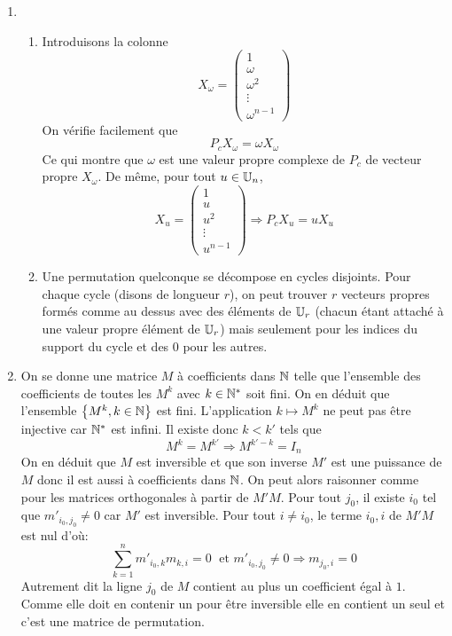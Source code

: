 \begin{enumerate}
  \item 
\begin{enumerate}
  \item   Introduisons la colonne
\begin{displaymath}
  X_{\omega}=
\begin{pmatrix}
  1 \\ \omega \\ \omega^2 \\ \vdots \\ \omega^{n-1}
\end{pmatrix}
\end{displaymath}
On vérifie facilement que
\begin{displaymath}
P_{c}X_\omega = \omega X_\omega  
\end{displaymath}
Ce qui montre que $\omega$ est une valeur propre complexe de $P_c$ de vecteur propre $X_\omega$. De même, pour tout $u\in \mathbb{U}_n$,
\begin{displaymath}
  X_{u}=
\begin{pmatrix}
  1 \\ u \\ u^2 \\ \vdots \\ u^{n-1}
\end{pmatrix}
\Rightarrow P_{c}X_u = u X_u  
\end{displaymath}

  \item Une permutation quelconque se décompose en cycles disjoints. Pour chaque cycle (disons de longueur $r$), on peut trouver $r$ vecteurs propres formés comme au dessus avec des éléments de $\mathbb{U}_r$ (chacun étant attaché à une valeur propre élément de $\mathbb{U}_r$) mais seulement pour les indices du support du cycle et des $0$ pour les autres.
\end{enumerate}
  
  \item On se donne une matrice $M$ à coefficients dans $\mathbb{N}$ telle que l'ensemble des coefficients de toutes les $M^k$ avec $k\in \mathbb{N}^*$ soit fini. On en déduit que l'ensemble $\left\lbrace M^k, k\in \mathbb{N}\right\rbrace$ est fini. L'application $k\mapsto M^k$ ne peut pas être injective car $\mathbb{N}^*$ est infini. Il existe donc $k<k'$ tels que
\begin{displaymath}
M^k = M^{k'} \Rightarrow M^{k'-k} = I_n  
\end{displaymath}
On en déduit que $M$ est inversible et que son inverse $M'$ est une puissance de $M$ donc il est aussi à coefficients dans $\mathbb{N}$. On peut alors raisonner comme pour les matrices orthogonales à partir de $M'M$.\newline
Pour tout $j_0$, il existe $i_0$ tel que $m'_{i_0,j_0}\neq 0$ car $M'$ est inversible. Pour tout $i\neq i_0$, le terme $i_0,i$ de $M'M$ est nul d'où:
\begin{displaymath}
  \sum_{k=1}^n m'_{i_0,k}m_{k,i} = 0 \;\text{ et } m'_{i_0,j_0}\neq 0 \Rightarrow m_{j_0,i}=0
\end{displaymath}
Autrement dit la ligne $j_0$ de $M$ contient au plus un coefficient égal à $1$. Comme elle doit en contenir un pour être inversible elle en contient un seul et c'est une matrice de permutation. 
\end{enumerate}


